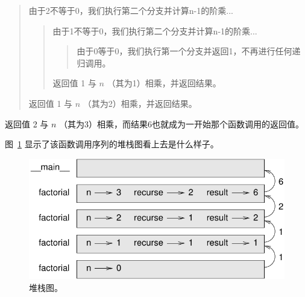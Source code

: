 \begin{quote}

由于2不等于0，我们执行第二个分支并计算n-1的阶乘...

  \begin{quote}

  由于1不等于0，我们执行第二个分支并计算n-1的阶乘...

    \begin{quote}

    由于0等于0，我们执行第一个分支并返回1，不再进行任何递归调用。

    \end{quote}



  返回值 1 与 $n$ （其为1）相乘，并返回结果。
  \end{quote}



返回值 1 与 $n$ （其为2）相乘，并返回结果。
\end{quote}



返回值 2 与 $n$ （其为3）相乘，而结果6也就成为一开始那个函数调用的返回值。


图~\ref{fig.stack3} 显示了该函数调用序列的堆栈图看上去是什么样子。

\begin{figure}
\centerline
{\includegraphics[scale=0.8]{../source/figs/stack3.pdf}}
\caption{堆栈图。}
\label{fig.stack3}
\end{figure}

